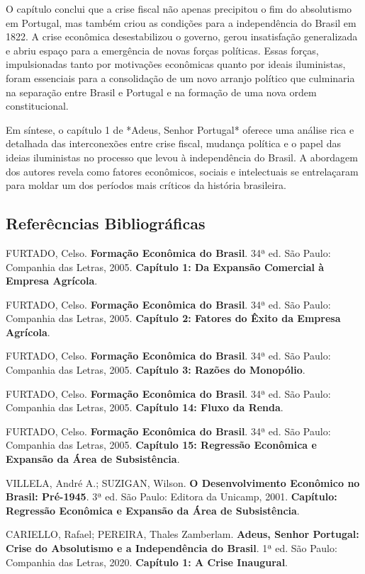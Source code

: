 \documentclass[a4paper,12pt]{article}[abntex2]
\begin{document}
O capítulo conclui que a crise fiscal não apenas precipitou o fim do absolutismo em Portugal, mas também criou as condições para a independência do Brasil em 1822. A crise econômica desestabilizou o governo, gerou insatisfação generalizada e abriu espaço para a emergência de novas forças políticas. Essas forças, impulsionadas tanto por motivações econômicas quanto por ideais iluministas, foram essenciais para a consolidação de um novo arranjo político que culminaria na separação entre Brasil e Portugal e na formação de uma nova ordem constitucional.

Em síntese, o capítulo 1 de *Adeus, Senhor Portugal* oferece uma análise rica e detalhada das interconexões entre crise fiscal, mudança política e o papel das ideias iluministas no processo que levou à independência do Brasil. A abordagem dos autores revela como fatores econômicos, sociais e intelectuais se entrelaçaram para moldar um dos períodos mais críticos da história brasileira.

\subsection{\textbf{Referêcncias Bibliográficas}}
\begin{thebibliography}{99}

FURTADO, Celso. \textbf{Formação Econômica do Brasil}. 34ª ed. São Paulo: Companhia das Letras, 2005.
\textbf{Capítulo 1: Da Expansão Comercial à Empresa Agrícola}.

FURTADO, Celso. \textbf{Formação Econômica do Brasil}. 34ª ed. São Paulo: Companhia das Letras, 2005.
\textbf{Capítulo 2: Fatores do Êxito da Empresa Agrícola}.

FURTADO, Celso. \textbf{Formação Econômica do Brasil}. 34ª ed. São Paulo: Companhia das Letras, 2005.
\textbf{Capítulo 3: Razões do Monopólio}.

FURTADO, Celso. \textbf{Formação Econômica do Brasil}. 34ª ed. São Paulo: Companhia das Letras, 2005.
\textbf{Capítulo 14: Fluxo da Renda}.

FURTADO, Celso. \textbf{Formação Econômica do Brasil}. 34ª ed. São Paulo: Companhia das Letras, 2005.
\textbf{Capítulo 15: Regressão Econômica e Expansão da Área de Subsistência}.

VILLELA, André A.; SUZIGAN, Wilson. \textbf{O Desenvolvimento Econômico no Brasil: Pré-1945}. 3ª ed. São Paulo: Editora da Unicamp, 2001.
\textbf{Capítulo: Regressão Econômica e Expansão da Área de Subsistência}.

CARIELLO, Rafael; PEREIRA, Thales Zamberlam. \textbf{Adeus, Senhor Portugal: Crise do Absolutismo e a Independência do Brasil}. 1ª ed. São Paulo: Companhia das Letras, 2020.
\textbf{Capítulo 1: A Crise Inaugural}.

\end{thebibliography}
\end{document}
